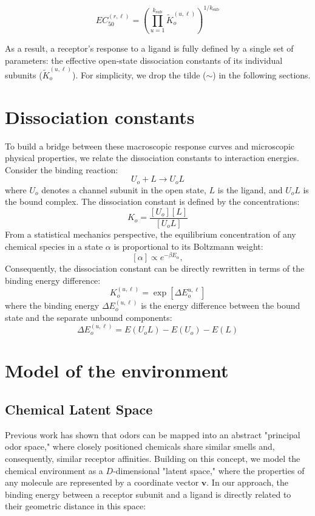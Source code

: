 \documentclass[
    reprint, %
    amsmath,
    amssymb,
    aps,
    prb,      %
    floatfix
]{revtex4-2}
\begin{document}
$$EC_{50}^{(r,\ell)} = \left( \prod_{u=1}^{k_\text{sub}} \tilde{K}_o^{(u,\ell)} \right)^{1/k_\text{sub}}$$

As a result, a receptor's response to a ligand is fully defined by a single set of parameters: the effective open-state dissociation constants of its individual subunits ($\tilde{K}_o^{(u,\ell)}$). For simplicity, we drop the tilde ($\sim$) in the following sections.


\section{Dissociation constants}
To build a bridge between these macroscopic response curves and microscopic physical properties, we relate the dissociation constants to interaction energies. Consider the binding reaction:
$$
U_o + L \rightarrow U_o L
$$
where $U_o$ denotes a channel subunit in the open state, $L$ is the ligand, and $U_oL$ is the bound complex.
The dissociation constant is defined by the concentrations:
$$
K_o = \frac{[U_o][L]}{[U_oL]}
$$
From a statistical mechanics perspective, the equilibrium concentration of any chemical species in a state $\alpha$ is proportional to its Boltzmann weight:
$$
[\alpha] \propto e^{-\beta E_\alpha},
$$
Consequently, the dissociation constant can be directly rewritten in terms of the binding energy difference:
$$
K_o^{(u,\ell)} = \exp\left[ \Delta E_o^{u,\ell} \right]
$$
where the binding energy $\Delta E_o^{(u,\ell)}$ is the energy difference between the bound state and the separate unbound components:
$$
\Delta E_o^{(u,\ell)} = E(U_oL) - E(U_o) - E(L) 
$$

\section{Model of the environment}
\subsection{Chemical Latent Space}
Previous work \cite{map} has shown that odors can be mapped into an abstract "principal odor space," where closely positioned chemicals share similar smells and, consequently, similar receptor affinities. Building on this concept, we model the chemical environment as a $D$-dimensional "latent space," where the properties of any molecule are represented by a coordinate vector $\textbf{v}$. 
In our approach, the binding energy between a receptor subunit and a ligand is directly related to their geometric distance in this space:
\end{document}
